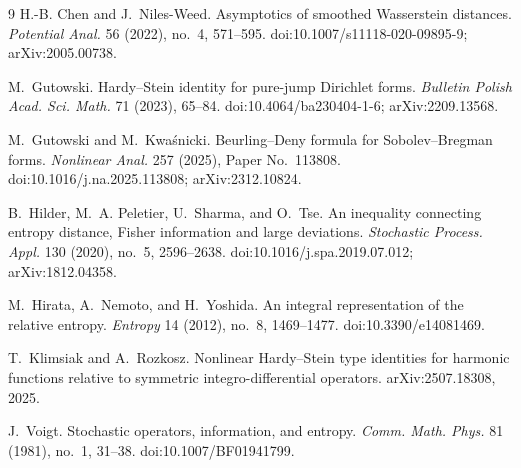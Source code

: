 \begin{thebibliography}{9}
H.-B. Chen and J.~Niles-Weed.
\newblock Asymptotics of smoothed Wasserstein distances.
\newblock \emph{Potential Anal.} 56 (2022), no.~4, 571--595.
\newblock doi:10.1007/s11118-020-09895-9; arXiv:2005.00738.

M.~Gutowski.
\newblock Hardy--Stein identity for pure-jump Dirichlet forms.
\newblock \emph{Bulletin Polish Acad. Sci. Math.} 71 (2023), 65--84.
\newblock doi:10.4064/ba230404-1-6; arXiv:2209.13568.

M.~Gutowski and M.~Kwa{\'s}nicki.
\newblock Beurling--Deny formula for Sobolev--Bregman forms.
\newblock \emph{Nonlinear Anal.} 257 (2025), Paper No.~113808.
\newblock doi:10.1016/j.na.2025.113808; arXiv:2312.10824.

B.~Hilder, M.~A. Peletier, U.~Sharma, and O.~Tse.
\newblock An inequality connecting entropy distance, Fisher information and
large deviations.
\newblock \emph{Stochastic Process. Appl.} 130 (2020), no.~5, 2596--2638.
\newblock doi:10.1016/j.spa.2019.07.012; arXiv:1812.04358.

M.~Hirata, A.~Nemoto, and H.~Yoshida.
\newblock An integral representation of the relative entropy.
\newblock \emph{Entropy} 14 (2012), no.~8, 1469--1477.
\newblock doi:10.3390/e14081469.

T.~Klimsiak and A.~Rozkosz.
\newblock Nonlinear Hardy--Stein type identities for harmonic functions
relative to symmetric integro-differential operators.
\newblock arXiv:2507.18308, 2025.

J.~Voigt.
\newblock Stochastic operators, information, and entropy.
\newblock \emph{Comm. Math. Phys.} 81 (1981), no.~1, 31--38.
\newblock doi:10.1007/BF01941799.

\end{thebibliography}
